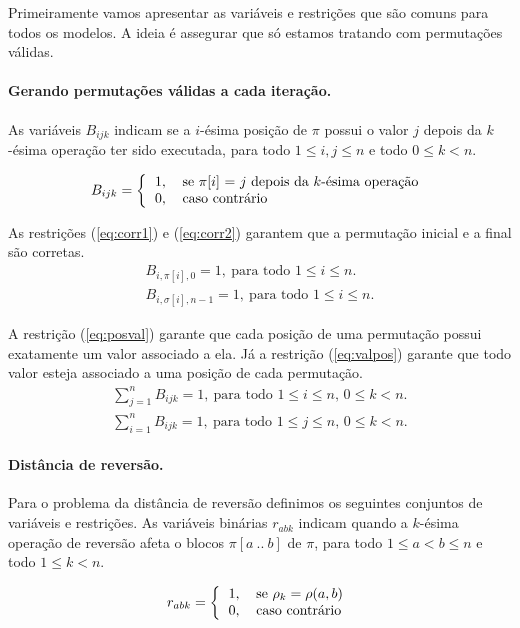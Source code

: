 Primeiramente vamos apresentar as variáveis e restrições que são comuns
para todos os modelos. A ideia é assegurar que só estamos tratando com
permutações válidas.

\paragraph{Gerando permutações válidas a cada iteração.} As variáveis
$B_{ijk}$ indicam se a $i$-ésima posição de $\pi$ possui o valor $j$
depois da $k$-ésima operação ter sido executada, para todo $1 \le i, j
\le n$ e todo $ 0 \le k < n$.

\[ 
B_{ijk} = \left \{ 
\begin{tabular}{ll} 
  1, & se $\pi[i]$ = $j$ depois da $k$-ésima operação \\ 
  0, & caso contrário
\end{tabular} 
\right .
\]

As restrições (\ref{eq:corr1}) e (\ref{eq:corr2}) garantem que a
permutação inicial e a final são corretas. 
\begin{align} 
  B_{i,\pi[i],0} = 1,~\text{para todo $1 \le i \le n$}. \label{eq:corr1} \\
  B_{i,\sigma[i],n-1} = 1,~\text{para todo $1 \le i \le n$}. \label{eq:corr2}
\end{align}

A restrição (\ref{eq:posval}) garante que cada posição de uma permutação
possui exatamente um valor associado a ela. Já a restrição
(\ref{eq:valpos}) garante que todo valor esteja associado a uma posição
de cada permutação.
\begin{align}
  \sum_{j=1}^{n} B_{ijk} = 1,~\text{para todo $1 \le i \le n$, 
  $0 \le k < n$}. \label{eq:posval} \\
  \sum_{i=1}^{n} B_{ijk} = 1,~\text{para todo $1 \le j \le n$, $0 \le
   k < n$}. \label{eq:valpos}
\end{align}

\paragraph{Distância de reversão.}
Para o problema da distância de reversão definimos os seguintes
conjuntos de variáveis e restrições. As variáveis binárias $r_{abk}$
indicam quando a $k$-ésima operação de reversão afeta o blocos
$\pi[a~..~b]$ de $\pi$, para todo $1 \le a < b \le n$ e todo $1 \le k <
n$.

\[
r_{abk} = \left \{ 
\begin{tabular}{ll} 
  1, & se $\rho_{k} = \rho(a,b)$ \\
  0, & caso contrário
\end{tabular} 
\right .
\]

